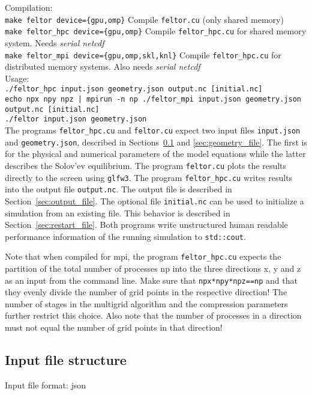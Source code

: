 Compilation:\\
\texttt{make feltor device=\{gpu,omp\}} Compile \texttt{feltor.cu} (only shared memory)\\
\texttt{make feltor\_hpc device=\{gpu,omp\}} Compile \texttt{feltor\_hpc.cu} for shared memory system. Needs {\it serial netcdf} \\
\texttt{make feltor\_mpi device=\{gpu,omp,skl,knl\}} Compile \texttt{feltor\_hpc.cu} for distributed memory systems. Also needs {\it serial netcdf}\\
Usage:\\
\texttt{./feltor\_hpc input.json geometry.json output.nc [initial.nc]} \\
\texttt{echo npx npy npz | mpirun -n np ./feltor\_mpi input.json geometry.json output.nc [initial.nc]} \\
\texttt{./feltor input.json geometry.json } \\

The programs \texttt{feltor\_hpc.cu} and \texttt{feltor.cu} expect two input
files \texttt{input.json} and \texttt{geometry.json}, described in Sections~\ref{sec:input_file} and \ref{sec:geometry_file}.
The first is for the physical and numerical parameters of the model equations
while the latter describes the Solov'ev equilibrium.
 The program \texttt{feltor.cu} plots the results directly to the screen using \texttt{glfw3}.
The program \texttt{feltor\_hpc.cu} writes results into
the output file \texttt{output.nc}.
 The output file is described in Section~\ref{sec:output_file}.
 The optional file \texttt{initial.nc} can be used to initialize a simulation from an existing file.
 This behavior is described in Section~\ref{sec:restart_file}.
 Both programs write unstructured human readable performance information of the running simulation
 to \texttt{std::cout}.

Note that when compiled for mpi, the program \texttt{feltor\_hpc.cu} expects the
partition of the total number of processes np into the three directions x, y and z
as an input from the command line. Make sure that \texttt{npx*npy*npz==np} and that
they evenly divide the number of grid points in the respective direction! The
number of stages in the multigrid algorithm and the compression parameters further
restrict this choice. Also note that the number of processes in a direction must
not equal the number of grid points in that direction!


\subsection{Input file structure} \label{sec:input_file}
Input file format: json


